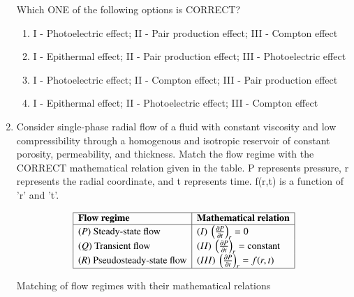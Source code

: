\documentclass[journal,12pt,onecolumn]{IEEEtran}
\theoremstyle{remark}
\begin{document}
\begin{enumerate}
Which ONE of the following options is CORRECT?

\begin{enumerate}
    \item I - Photoelectric effect; II - Pair production effect; III - Compton effect
    \item I - Epithermal effect; II - Pair production effect; III - Photoelectric effect
    \item I - Photoelectric effect; II - Compton effect; III - Pair production effect
    \item I - Epithermal effect; II - Photoelectric effect; III - Compton effect
\end{enumerate}
\hfill{}



 \item Consider single-phase radial flow of a fluid with constant viscosity and low compressibility through a homogenous and isotropic reservoir of constant porosity, permeability, and thickness. Match the flow regime with the CORRECT mathematical relation given in the table. P represents pressure, r represents the radial coordinate, and t represents time. f(r,t) is a function of 'r' and 't'.

\begin{table}[h!]
\centering
\[
\begin{array}{|l|l|}
\hline
\textbf{Flow regime} & \textbf{Mathematical relation} \\
\hline
(P)\ \text{Steady-state flow}        & (I)\ \left(\tfrac{\partial P}{\partial t}\right)_r = 0 \\
(Q)\ \text{Transient flow}           & (II)\ \left(\tfrac{\partial P}{\partial t}\right)_r = \text{constant} \\
(R)\ \text{Pseudosteady-state flow}  & (III)\ \left(\tfrac{\partial P}{\partial t}\right)_r = f(r,t) \\
\hline
\end{array}
\]
\caption{Matching of flow regimes with their mathematical relations}
\label{tab:flow}
\end{table}



\end{enumerate}
\end{document}
